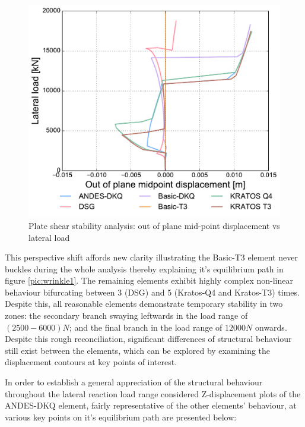 \begin{figure}[H]
	\centering
	\def\svgwidth{\columnwidth}
	\includegraphics[width=12cm]{images/stability_wrinkle_pointtrans_disp.pdf}
	\caption{Plate shear stability analysis: out of plane mid-point displacement vs lateral load}
	\label{pic:wrinkle2}
\end{figure}

This perspective shift affords new clarity illustrating the Basic-T3 element never buckles during the whole analysis thereby explaining it's equilibrium path in figure \ref{pic:wrinkle1}. The remaining elements exhibit highly complex non-linear behaviour bifurcating between 3 (DSG) and 5 (Kratos-Q4 and Kratos-T3) times. Despite this, all reasonable elements demonstrate temporary stability in two zones: the secondary branch swaying leftwards in the load range of $(2500 - 6000)N$; and the final branch in the load range of $12000 N$ onwards. Despite this rough reconciliation, significant differences of structural behaviour still exist between the elements, which can be explored by examining the displacement contours at key points of interest.

In order to establish a general appreciation of the structural behaviour throughout the lateral reaction load range considered Z-displacement plots of the ANDES-DKQ element, fairly representative of the other elements' behaviour, at various key points on it's equilibrium path are presented below:

